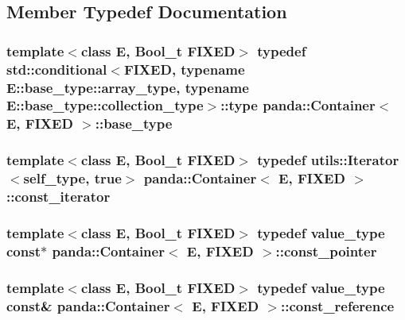 \subsection{Member Typedef Documentation}
\hypertarget{classpanda_1_1Container_a8992944adadcfadc748a10c3806287ac}{
\subsubsection[{base\-\_\-type}]{\setlength{\rightskip}{0pt plus 5cm}template$<$class E, Bool\-\_\-t F\-I\-X\-E\-D$>$ typedef std\-::conditional$<$F\-I\-X\-E\-D, typename E\-::base\-\_\-type\-::array\-\_\-type, typename E\-::base\-\_\-type\-::collection\-\_\-type$>$\-::type {\bf panda\-::\-Container}$<$ E, F\-I\-X\-E\-D $>$\-::{\bf base\-\_\-type}}}\label{classpanda_1_1Container_a8992944adadcfadc748a10c3806287ac}
\hypertarget{classpanda_1_1Container_a0f9926d6b9fa94064fdbe119f0da78ed}{
\subsubsection[{const\-\_\-iterator}]{\setlength{\rightskip}{0pt plus 5cm}template$<$class E, Bool\-\_\-t F\-I\-X\-E\-D$>$ typedef {\bf utils\-::\-Iterator}$<${\bf self\-\_\-type}, true$>$ {\bf panda\-::\-Container}$<$ E, F\-I\-X\-E\-D $>$\-::{\bf const\-\_\-iterator}}}\label{classpanda_1_1Container_a0f9926d6b9fa94064fdbe119f0da78ed}
\hypertarget{classpanda_1_1Container_a6a208612c0f0c4bddce70a7e9f4b2df3}{
\subsubsection[{const\-\_\-pointer}]{\setlength{\rightskip}{0pt plus 5cm}template$<$class E, Bool\-\_\-t F\-I\-X\-E\-D$>$ typedef {\bf value\-\_\-type} const$\ast$ {\bf panda\-::\-Container}$<$ E, F\-I\-X\-E\-D $>$\-::{\bf const\-\_\-pointer}}}\label{classpanda_1_1Container_a6a208612c0f0c4bddce70a7e9f4b2df3}
\hypertarget{classpanda_1_1Container_a336135bd19b8b176006d8e7413c8c8f1}{
\subsubsection[{const\-\_\-reference}]{\setlength{\rightskip}{0pt plus 5cm}template$<$class E, Bool\-\_\-t F\-I\-X\-E\-D$>$ typedef {\bf value\-\_\-type} const\& {\bf panda\-::\-Container}$<$ E, F\-I\-X\-E\-D $>$\-::{\bf const\-\_\-reference}}}\label{classpanda_1_1Container_a336135bd19b8b176006d8e7413c8c8f1}
